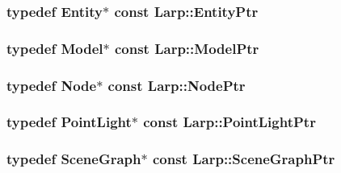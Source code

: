 \subsubsection[{\texorpdfstring{Entity\+Ptr}{EntityPtr}}]{\setlength{\rightskip}{0pt plus 5cm}typedef {\bf Entity}$\ast$ const {\bf Larp\+::\+Entity\+Ptr}}\hypertarget{namespaceLarp_a775efcc4cabb308d50168c52df343353}{}\label{namespaceLarp_a775efcc4cabb308d50168c52df343353}
\subsubsection[{\texorpdfstring{Model\+Ptr}{ModelPtr}}]{\setlength{\rightskip}{0pt plus 5cm}typedef {\bf Model}$\ast$ const {\bf Larp\+::\+Model\+Ptr}}\hypertarget{namespaceLarp_a1fbc1dec59f7a571dc06e152b1e7d38c}{}\label{namespaceLarp_a1fbc1dec59f7a571dc06e152b1e7d38c}
\subsubsection[{\texorpdfstring{Node\+Ptr}{NodePtr}}]{\setlength{\rightskip}{0pt plus 5cm}typedef {\bf Node}$\ast$ const {\bf Larp\+::\+Node\+Ptr}}\hypertarget{namespaceLarp_a171c1dc8b70cfb441b15d7386780db23}{}\label{namespaceLarp_a171c1dc8b70cfb441b15d7386780db23}
\subsubsection[{\texorpdfstring{Point\+Light\+Ptr}{PointLightPtr}}]{\setlength{\rightskip}{0pt plus 5cm}typedef {\bf Point\+Light}$\ast$ const {\bf Larp\+::\+Point\+Light\+Ptr}}\hypertarget{namespaceLarp_a07215808e8e3c5229ca8549c5450e3e5}{}\label{namespaceLarp_a07215808e8e3c5229ca8549c5450e3e5}
\subsubsection[{\texorpdfstring{Scene\+Graph\+Ptr}{SceneGraphPtr}}]{\setlength{\rightskip}{0pt plus 5cm}typedef {\bf Scene\+Graph}$\ast$ const {\bf Larp\+::\+Scene\+Graph\+Ptr}}\hypertarget{namespaceLarp_acf02d81e4b52238dcd17cb6249eadadc}{}\label{namespaceLarp_acf02d81e4b52238dcd17cb6249eadadc}
